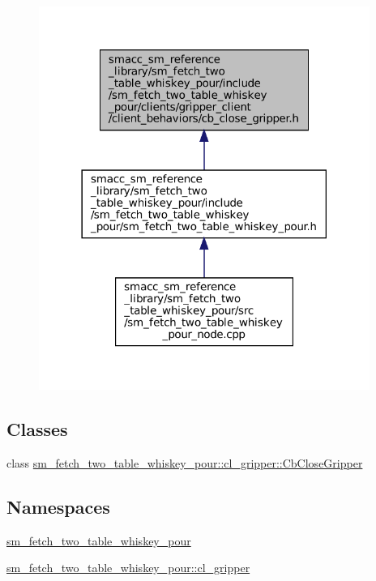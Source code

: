 \begin{figure}[H]
\begin{center}
\leavevmode
\includegraphics[width=306pt]{sm__fetch__two__table__whiskey__pour_2include_2sm__fetch__two__table__whiskey__pour_2clients_2gr25067eefc05fef1e738cf907f3e546c6}
\end{center}
\end{figure}
\subsection*{Classes}
\begin{DoxyCompactItemize}
\item 
class \hyperlink{classsm__fetch__two__table__whiskey__pour_1_1cl__gripper_1_1CbCloseGripper}{sm\+\_\+fetch\+\_\+two\+\_\+table\+\_\+whiskey\+\_\+pour\+::cl\+\_\+gripper\+::\+Cb\+Close\+Gripper}
\end{DoxyCompactItemize}
\subsection*{Namespaces}
\begin{DoxyCompactItemize}
\item 
 \hyperlink{namespacesm__fetch__two__table__whiskey__pour}{sm\+\_\+fetch\+\_\+two\+\_\+table\+\_\+whiskey\+\_\+pour}
\item 
 \hyperlink{namespacesm__fetch__two__table__whiskey__pour_1_1cl__gripper}{sm\+\_\+fetch\+\_\+two\+\_\+table\+\_\+whiskey\+\_\+pour\+::cl\+\_\+gripper}
\end{DoxyCompactItemize}
